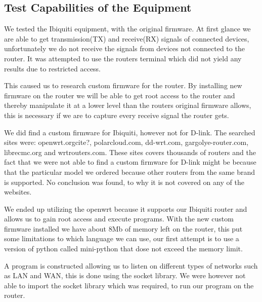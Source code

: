 \subsection*{Test Capabilities of the Equipment}
We tested the Ibiquiti equipment, with the original firmware. At first glance we are able to get transmission(TX) and receive(RX) signals of connected devices, unfortunately we do not receive the signals from devices not connected to the router. It was attempted to use the routers terminal which did not yield any results due to restricted access.

This caused us to research custom firmware for the router. By installing new firmware on the router we will be able to get root access to the router and thereby manipulate it at a lower level than the routers original firmware allows, this is necessary if we are to capture every receive signal the router gets.

We did find a custom firmware for Ibiquiti, however not for D-link. The searched sites were: openwrt.org{cite?}, polarcloud.com, dd-wrt.com, gargolye-router.com, librecmc.org and wrtrouters.com. These sites covers thousands of routers and the fact that we were not able to find a custom firmware for D-link might be because that the particular model we ordered because other routers from the same brand is supported. No conclusion was found, to why it is not covered on any of the websites.

We ended up utilizing the openwrt because it supports our Ibiquiti router and allows us to gain root access and execute programs. With the new custom firmware installed we have about 8Mb of memory left on the router, this put some limitations to which language we can use, our first attempt is to use a version of python called mini-python that dose not exceed the memory limit.

A program is constructed allowing us to listen on different types of networks such as LAN and WAN, this is done using the socket library. We were however not able to import the socket library which was required, to run our program on the router.